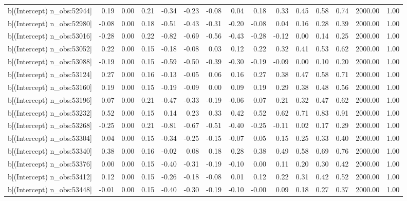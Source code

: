 \begin{table}[ht]
\begin{tabular}{rrrrrrrrrrrrrrr}
  b[(Intercept) n\_obs:52944] & 0.19 & 0.00 & 0.21 & -0.34 & -0.23 & -0.08 & 0.04 & 0.18 & 0.33 & 0.45 & 0.58 & 0.74 & 2000.00 & 1.00 \\ 
  b[(Intercept) n\_obs:52980] & -0.08 & 0.00 & 0.18 & -0.51 & -0.43 & -0.31 & -0.20 & -0.08 & 0.04 & 0.16 & 0.28 & 0.39 & 2000.00 & 1.00 \\ 
  b[(Intercept) n\_obs:53016] & -0.28 & 0.00 & 0.22 & -0.82 & -0.69 & -0.56 & -0.43 & -0.28 & -0.12 & 0.00 & 0.14 & 0.25 & 2000.00 & 1.00 \\ 
  b[(Intercept) n\_obs:53052] & 0.22 & 0.00 & 0.15 & -0.18 & -0.08 & 0.03 & 0.12 & 0.22 & 0.32 & 0.41 & 0.53 & 0.62 & 2000.00 & 1.00 \\ 
  b[(Intercept) n\_obs:53088] & -0.19 & 0.00 & 0.15 & -0.59 & -0.50 & -0.39 & -0.30 & -0.19 & -0.09 & 0.00 & 0.10 & 0.20 & 2000.00 & 1.00 \\ 
  b[(Intercept) n\_obs:53124] & 0.27 & 0.00 & 0.16 & -0.13 & -0.05 & 0.06 & 0.16 & 0.27 & 0.38 & 0.47 & 0.58 & 0.71 & 2000.00 & 1.00 \\ 
  b[(Intercept) n\_obs:53160] & 0.19 & 0.00 & 0.15 & -0.19 & -0.09 & 0.00 & 0.09 & 0.19 & 0.29 & 0.38 & 0.48 & 0.56 & 2000.00 & 1.00 \\ 
  b[(Intercept) n\_obs:53196] & 0.07 & 0.00 & 0.21 & -0.47 & -0.33 & -0.19 & -0.06 & 0.07 & 0.21 & 0.32 & 0.47 & 0.62 & 2000.00 & 1.00 \\ 
  b[(Intercept) n\_obs:53232] & 0.52 & 0.00 & 0.15 & 0.14 & 0.23 & 0.33 & 0.42 & 0.52 & 0.62 & 0.71 & 0.83 & 0.91 & 2000.00 & 1.00 \\ 
  b[(Intercept) n\_obs:53268] & -0.25 & 0.00 & 0.21 & -0.81 & -0.67 & -0.51 & -0.40 & -0.25 & -0.11 & 0.02 & 0.17 & 0.29 & 2000.00 & 1.00 \\ 
  b[(Intercept) n\_obs:53304] & 0.04 & 0.00 & 0.15 & -0.34 & -0.25 & -0.15 & -0.07 & 0.05 & 0.15 & 0.25 & 0.33 & 0.40 & 2000.00 & 1.00 \\ 
  b[(Intercept) n\_obs:53340] & 0.38 & 0.00 & 0.16 & -0.02 & 0.08 & 0.18 & 0.28 & 0.38 & 0.49 & 0.58 & 0.69 & 0.76 & 2000.00 & 1.00 \\ 
  b[(Intercept) n\_obs:53376] & 0.00 & 0.00 & 0.15 & -0.40 & -0.31 & -0.19 & -0.10 & 0.00 & 0.11 & 0.20 & 0.30 & 0.42 & 2000.00 & 1.00 \\ 
  b[(Intercept) n\_obs:53412] & 0.12 & 0.00 & 0.15 & -0.26 & -0.18 & -0.08 & 0.01 & 0.12 & 0.22 & 0.31 & 0.42 & 0.52 & 2000.00 & 1.00 \\ 
  b[(Intercept) n\_obs:53448] & -0.01 & 0.00 & 0.15 & -0.40 & -0.30 & -0.19 & -0.10 & -0.00 & 0.09 & 0.18 & 0.27 & 0.37 & 2000.00 & 1.00 \\ 

\end{tabular}
\end{table}
